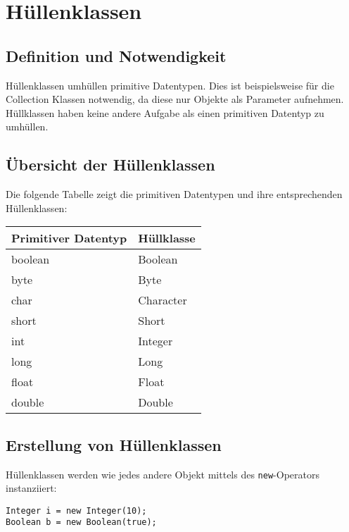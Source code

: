 \chapter{Hüllenklassen}

\section{Definition und Notwendigkeit}
Hüllenklassen umhüllen primitive Datentypen. Dies ist beispielsweise für die Collection Klassen notwendig, da diese nur Objekte als Parameter aufnehmen. Hüllklassen haben keine andere Aufgabe als einen primitiven Datentyp zu umhüllen.

\section{Übersicht der Hüllenklassen}
Die folgende Tabelle zeigt die primitiven Datentypen und ihre entsprechenden Hüllenklassen:

\begin{center}
\begin{tabular}{|l|l|}
\hline
\textbf{Primitiver Datentyp} & \textbf{Hüllklasse} \\
\hline\hline
boolean             & Boolean     \\
\hline
byte                & Byte        \\
\hline
char                & Character   \\
\hline
short               & Short       \\
\hline
int                 & Integer     \\
\hline
long                & Long        \\
\hline
float               & Float       \\
\hline
double              & Double      \\
\hline
\end{tabular}
\end{center}

\section{Erstellung von Hüllenklassen}
\label{sec:erstellung_huellenklassen}
Hüllenklassen werden wie jedes andere Objekt mittels des \texttt{new}-Operators instanziiert:

\begin{lstlisting}[caption={Erstellung von Hüllenklassen-Objekten}]
Integer i = new Integer(10);
Boolean b = new Boolean(true);
\end{lstlisting}

